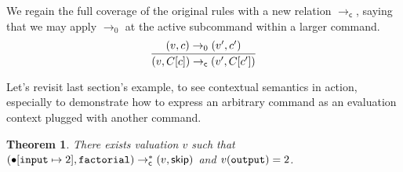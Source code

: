 \documentclass{amsbook}
\newtheorem{theorem}{Theorem}[chapter]
\theoremstyle{definition}
\theoremstyle{remark}
\numberwithin{section}{chapter}
\numberwithin{equation}{chapter}
\begin{document}
We regain the full coverage of the original rules with a new relation $\to_\mathsf{c}$, saying that we may apply $\to_0$ at the active subcommand within a larger command.
$$\infer{\smallstepc{(v, C[c])}{(v', C[c'])}}{
  \smallstepo{(v, c)}{(v', c')}
}$$

Let's revisit last section's example, to see contextual semantics in action, especially to demonstrate how to express an arbitrary command as an evaluation context plugged with another command.

\newcommand{\smallstepcs}[2]{#1 \to^*_\mathsf{c} #2}

\begin{theorem}
  There exists valuation $v$ such that $\smallstepcs{(\mupd{\mempty}{\mathtt{input}}{2}, \mathtt{factorial})}{(v, \skipe)}$ and $v(\mathtt{output}) = 2$.
\end{theorem}
\end{document}
